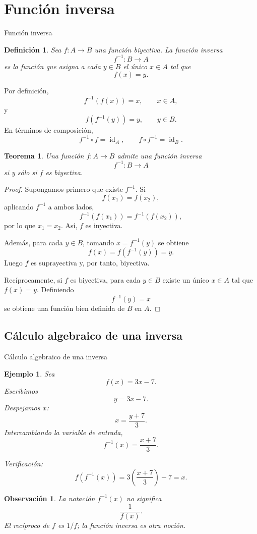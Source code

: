 \documentclass[aspectratio=169,10pt]{beamer}
\newtheorem{definicion}{Definición}
\newtheorem{teorema}{Teorema}
\newtheorem{observacion}{Observación}
\newtheorem{ejemplo}{Ejemplo}
\newcommand{\id}{\operatorname{id}}
\begin{document}
\section{Función inversa}
\begin{frame}{Función inversa}
\begin{definicion}
Sea $f:A\to B$ una función biyectiva. La función inversa
\[
f^{-1}:B\to A
\]
es la función que asigna a cada $y\in B$ el único $x\in A$ tal que
\[
f(x)=y.
\]
\end{definicion}

Por definición,
\[
f^{-1}(f(x))=x,\qquad x\in A,
\]
y
\[
f(f^{-1}(y))=y,\qquad y\in B.
\]
En términos de composición,
\[
f^{-1}\circ f=\id_A,
\qquad
f\circ f^{-1}=\id_B.
\]

\begin{teorema}
Una función $f:A\to B$ admite una función inversa
\[
f^{-1}:B\to A
\]
si y sólo si $f$ es biyectiva.
\end{teorema}

\begin{proof}
Supongamos primero que existe $f^{-1}$. Si
\[
f(x_1)=f(x_2),
\]
aplicando $f^{-1}$ a ambos lados,
\[
f^{-1}(f(x_1))=f^{-1}(f(x_2)),
\]
por lo que $x_1=x_2$. Así, $f$ es inyectiva.

Además, para cada $y\in B$, tomando $x=f^{-1}(y)$ se obtiene
\[
f(x)=f(f^{-1}(y))=y.
\]
Luego $f$ es suprayectiva y, por tanto, biyectiva.

Recíprocamente, si $f$ es biyectiva, para cada $y\in B$ existe un único
$x\in A$ tal que $f(x)=y$. Definiendo
\[
f^{-1}(y)=x
\]
se obtiene una función bien definida de $B$ en $A$.
\end{proof}
\end{frame}
\subsection*{Cálculo algebraico de una inversa}
\begin{frame}{Cálculo algebraico de una inversa}
\begin{ejemplo}
Sea
\[
f(x)=3x-7.
\]
Escribimos
\[
y=3x-7.
\]
Despejamos $x$:
\[
x=\frac{y+7}{3}.
\]
Intercambiando la variable de entrada,
\[
f^{-1}(x)=\frac{x+7}{3}.
\]

Verificación:
\[
f(f^{-1}(x))
=3\left(\frac{x+7}{3}\right)-7=x.
\]
\end{ejemplo}

\begin{observacion}
La notación $f^{-1}(x)$ no significa
\[
\frac{1}{f(x)}.
\]
El recíproco de $f$ es $1/f$; la función inversa es otra noción.
\end{observacion}

\end{frame}
\end{document}

